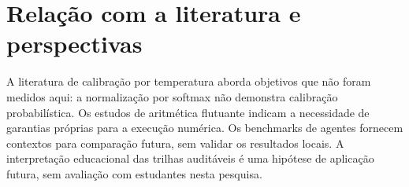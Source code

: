 \documentclass[12pt,openany,oneside,a4paper,brazil,chapter=TITLE]{abntex2}
\let\cite\citep
\begin{document}
\section{Relação com a literatura e perspectivas}
A literatura de calibração por temperatura \cite{komisarenko2024,xuan2025,xie2024} aborda objetivos que não foram medidos aqui: a normalização por softmax não demonstra calibração probabilística. Os estudos de aritmética flutuante \cite{bagnara2019,murray2026} indicam a necessidade de garantias próprias para a execução numérica. Os benchmarks de agentes \cite{agentbench2023,perspectivegap2026,orchrm2026,orchestrator2025} fornecem contextos para comparação futura, sem validar os resultados locais. A interpretação educacional das trilhas auditáveis é uma hipótese de aplicação futura, sem avaliação com estudantes nesta pesquisa.



\end{document}
